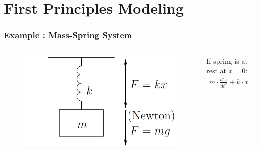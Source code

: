 \section{First Principles Modeling}


\begin{frame}
	\frametitle{Example : Mass-Spring System} 
	
	\begin{columns}
		\begin{column}{0.4\linewidth}
			\begin{figure}
				\centering
				\includegraphics[width=1\linewidth]{img/mass-spring}
				\label{fig:mass-spring}
			\end{figure}
		\end{column}
		\begin{column}{0.6\linewidth}
			If spring is at rest at $x=0$:
			\begin{align*}
			m \cdot \frac{d^{2}x}{dt^{2}} + k \cdot x =  m \cdot g \\
			\end{align*}
		\end{column}
	\end{columns}
\end{frame}


